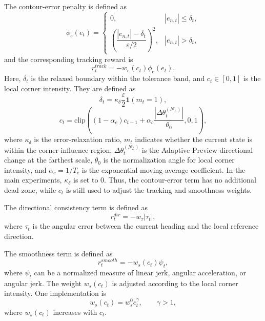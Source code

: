 \documentclass[preprint,12pt]{elsarticle}
\begin{document}
The contour-error penalty is defined as
\begin{equation}
\phi_e(e_t)=
\begin{cases}
0, & |e_{n,t}|\leq \delta_t,\\[4pt]
\left(\dfrac{|e_{n,t}|-\delta_t}{\varepsilon/2}\right)^2, & |e_{n,t}|>\delta_t,
\end{cases}
\end{equation}
and the corresponding tracking reward is
\begin{equation}
r_t^{track}=-w_e(c_t)\phi_e(e_t).
\end{equation}
Here, $\delta_t$ is the relaxed boundary within the tolerance band, and $c_t\in[0,1]$ is the local corner intensity. They are defined as
\begin{equation}
\delta_t=\kappa_{\delta}\frac{\varepsilon}{2}\mathbf{1}(m_t=1),
\end{equation}
\begin{equation}
c_t=\mathrm{clip}\left((1-\alpha_c)c_{t-1}+\alpha_c\frac{|\Delta\theta_t^{(N_L)}|}{\theta_0},0,1\right),
\end{equation}
where $\kappa_{\delta}$ is the error-relaxation ratio, $m_t$ indicates whether the current state is within the corner-influence region, $\Delta\theta_t^{(N_L)}$ is the Adaptive Preview directional change at the farthest scale, $\theta_0$ is the normalization angle for local corner intensity, and $\alpha_c=1/T_c$ is the exponential moving-average coefficient. In the main experiments, $\kappa_{\delta}$ is set to $0$. Thus, the contour-error term has no additional dead zone, while $c_t$ is still used to adjust the tracking and smoothness weights.

The directional consistency term is defined as
\begin{equation}
r_t^{dir}=-w_{\tau}|\tau_t|,
\end{equation}
where $\tau_t$ is the angular error between the current heading and the local reference direction.

The smoothness term is defined as
\begin{equation}
r_t^{smooth}=-w_s(c_t)\psi_t,
\end{equation}
where $\psi_t$ can be a normalized measure of linear jerk, angular acceleration, or angular jerk. The weight $w_s(c_t)$ is adjusted according to the local corner intensity. One implementation is
\begin{equation}
w_s(c_t)=w_s^0 c_t^{\gamma}, \qquad \gamma>1,
\end{equation}
where $w_s(c_t)$ increases with $c_t$.
\end{document}
